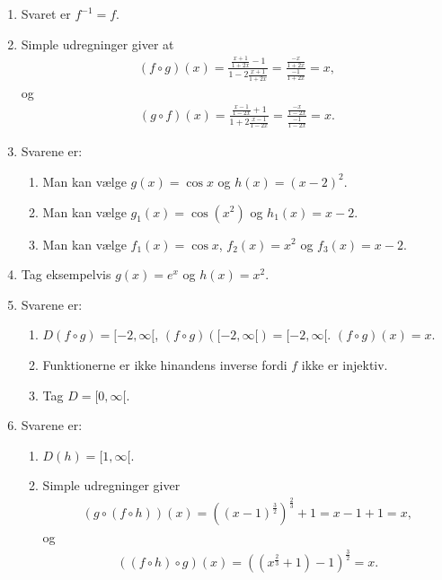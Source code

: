 \begin{enumerate}
	
	\item Svaret er $f^{-1}=f$.
	
	\item Simple udregninger giver at
	\begin{align*}
	(f\circ g)(x)=\frac{\frac{x+1}{1+2x}-1}{1-2\frac{x+1}{1+2x}}=\frac{\frac{-x}{1+2x}}{\frac{-1}{1+2x}}=x,
	\end{align*}
	og
	\begin{align*}
	(g\circ f)(x)=\frac{\frac{x-1}{1-2x}+1}{1+2\frac{x-1}{1-2x}}=\frac{\frac{-x}{1-2x}}{\frac{-1}{1-2x}}=x.
	\end{align*}
	
	\item Svarene er:
	\begin{enumerate}
		\item Man kan vælge $g(x)=\cos x$ og $h(x)=(x-2)^2$.
		\item Man kan vælge $g_1(x)=\cos(x^2)$ og $h_1(x)=x-2$.
		\item Man kan vælge $f_1(x)=\cos x$, $f_2(x)=x^2$ og $f_3(x)=x-2$.
	\end{enumerate}
	
	
	\item Tag eksempelvis $g(x)=e^x$ og $h(x)=x^2$.
	
	\item Svarene er:
	\begin{enumerate}
		\item $D(f\circ g)=[-2,\infty[$, $(f\circ g)([-2,\infty[)=[-2,\infty[$. $(f\circ g)(x)=x$.
		\item Funktionerne er ikke hinandens inverse fordi $f$ ikke er injektiv.
		\item Tag $D=[0,\infty[$.
	\end{enumerate}
	
		
	
	\item Svarene er: 
	\begin{enumerate}
		\item $D(h)=[1,\infty[$.
		\item Simple udregninger giver
		\begin{align*}
		(g\circ(f\circ h))(x)=((x-1)^{\frac{3}{2}})^{\frac{2}{3}}+1=x-1+1=x,
		\end{align*}
		og
		\begin{align*}
		((f \circ h)\circ g)(x)=((x^{\frac{2}{3}}+1)-1)^{\frac{3}{2}}=x.
		\end{align*}
		\end{enumerate}
	
	
	
	
\end{enumerate}